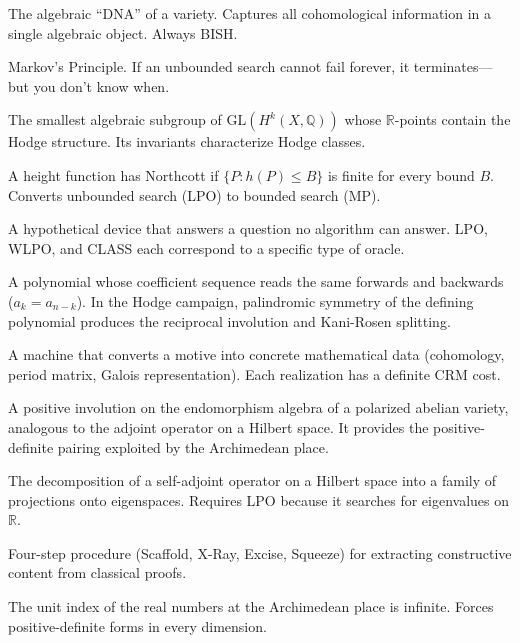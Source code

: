 \documentclass[11pt,twoside,openany]{report}
\theoremstyle{remark}
\newcommand{\BISH}{\textsf{BISH}}
\newcommand{\LPO}{\textsf{LPO}}
\newcommand{\CLASS}{\textsf{CLASS}}
\begin{document}
\begin{description}[style=nextline, leftmargin=2.5cm, labelwidth=2.3cm]
\item[Motive] The algebraic ``DNA'' of a variety. Captures all cohomological information in a single algebraic object. Always \BISH.

\item[MP] Markov's Principle. If an unbounded search cannot fail forever, it terminates---but you don't know when.

\item[Mumford-Tate group] The smallest algebraic subgroup of $\mathrm{GL}(H^k(X, \mathbb{Q}))$ whose $\mathbb{R}$-points contain the Hodge structure. Its invariants characterize Hodge classes.

\item[Northcott property] A height function has Northcott if $\{P : h(P) \leq B\}$ is finite for every bound $B$. Converts unbounded search (LPO) to bounded search (MP).

\item[Oracle] A hypothetical device that answers a question no algorithm can answer. LPO, WLPO, and \CLASS{} each correspond to a specific type of oracle.

\item[Palindromic] A polynomial whose coefficient sequence reads the same forwards and backwards ($a_k = a_{n-k}$). In the Hodge campaign, palindromic symmetry of the defining polynomial produces the reciprocal involution and Kani-Rosen splitting.

\item[Realization functor] A machine that converts a motive into concrete mathematical data (cohomology, period matrix, Galois representation). Each realization has a definite CRM cost.

\item[Rosati involution] A positive involution on the endomorphism algebra of a polarized abelian variety, analogous to the adjoint operator on a Hilbert space. It provides the positive-definite pairing exploited by the Archimedean place.

\item[Spectral theorem] The decomposition of a self-adjoint operator on a Hilbert space into a family of projections onto eigenspaces. Requires \LPO{} because it searches for eigenvalues on $\mathbb{R}$.

\item[Squeeze protocol] Four-step procedure (Scaffold, X-Ray, Excise, Squeeze) for extracting constructive content from classical proofs.

\item[$u(\mathbb{R}) = \infty$] The unit index of the real numbers at the Archimedean place is infinite. Forces positive-definite forms in every dimension.


\end{description}
\end{document}
